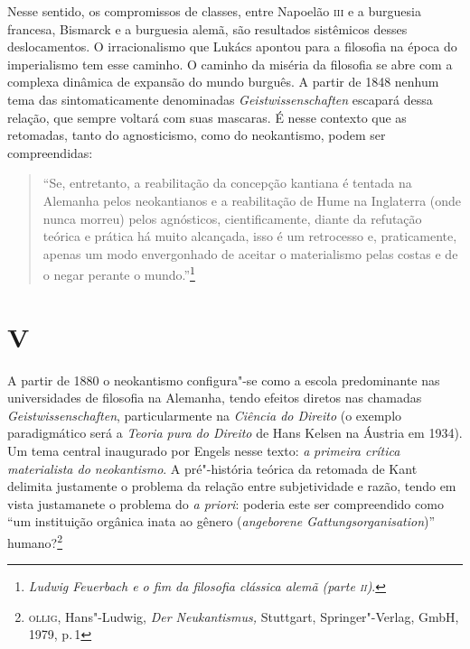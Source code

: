 Nesse sentido, os compromissos de classes, entre Napoelão \textsc{iii} e a
burguesia francesa, Bismarck e a burguesia alemã, são resultados
sistêmicos desses deslocamentos. O irracionalismo que Lukács apontou
para a filosofia na época do imperialismo tem esse caminho. O caminho da
miséria da filosofia se abre com a complexa dinâmica de expansão do
mundo burguês. A partir de 1848 nenhum tema das sintomaticamente
denominadas \emph{Geistwissenschaften} escapará dessa relação, que
sempre voltará com suas mascaras. É nesse contexto que as retomadas,
tanto do agnosticismo, como do neokantismo, podem ser compreendidas:

\begin{quote}
``Se, entretanto, a reabilitação da concepção kantiana é tentada na
Alemanha pelos neokantianos e a reabilitação de Hume na Inglaterra (onde
nunca morreu) pelos agnósticos, cientificamente, diante da refutação
teórica e prática há muito alcançada, isso é um retrocesso e,
praticamente, apenas um modo envergonhado de aceitar o materialismo
pelas costas e de o negar perante o mundo.''\footnote{\emph{Ludwig
  Feuerbach e o fim da filosofia clássica alemã (parte \textsc{ii})}.}
\end{quote}

\section*{V}

A partir de 1880 o neokantismo configura"-se como a escola predominante
nas universidades de filosofia na Alemanha, tendo efeitos diretos nas
chamadas \emph{Geistwissenschaften}, particularmente na \emph{Ciência do
Direito} (o exemplo paradigmático será a \emph{Teoria pura do Direito}
de Hans Kelsen na Áustria em 1934). Um tema central inaugurado por
Engels nesse texto: \emph{a} \emph{primeira crítica materialista do
neokantismo}. A pré"-história teórica da retomada de Kant delimita
justamente o problema da relação entre subjetividade e razão, tendo em
vista justamanete o problema do \emph{a priori}: poderia este ser
compreendido como ``um instituição orgânica inata ao gênero
(\emph{angeborene Gattungsorganisation})'' humano?\footnote{\textsc{ollig},
  Hans"-Ludwig, \emph{Der Neukantismus,} Stuttgart, Springer"-Verlag,
  GmbH, 1979, p.\,1}

